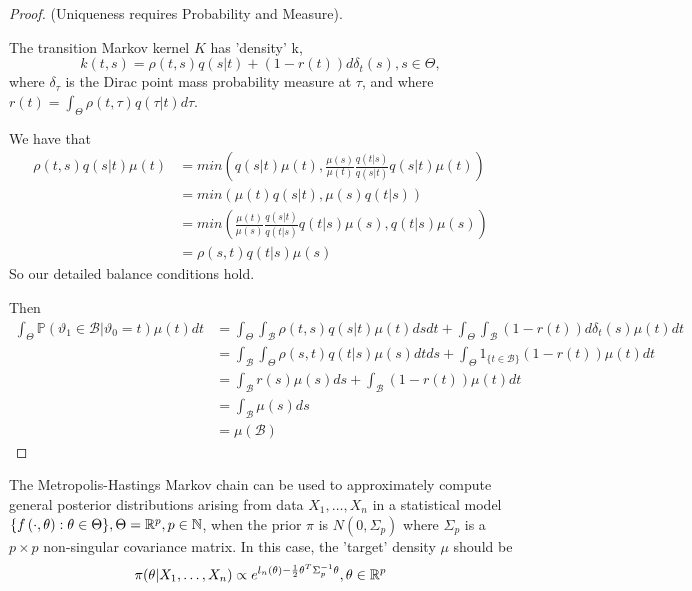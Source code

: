 \documentclass[a4paper]{article}
\begin{document}
 \begin{proof}
	 (Uniqueness requires Probability and Measure).

	 The transition Markov kernel $K$ has 'density' k,
	 \[
		 k(t,s) = \rho(t,s)q(s|t) + (1-r(t))d\delta_{t}(s), s \in \Theta
	 ,\]
	 where $\delta_{\tau}$ is the Dirac point mass probability measure at $\tau$, and where $r(t) = \int_{\Theta} \rho(t, \tau)q(\tau|t) d\tau$.

	 We have that
	 \begin{align*}
		 \rho(t,s)q(s|t)\mu(t) &= min\left( q(s|t)\mu(t), \frac{\mu(s)}{\mu(t)} \frac{q(t|s)}{q(s|t)} q(s|t)\mu(t) \right)  \\
		 &= min\left( \mu(t)q(s|t), \mu(s) q(t|s) \right)  \\
		 &= min\left( \frac{\mu(t)}{\mu(s)} \frac{q(s|t)}{q(t|s)} q(t|s)\mu(s), q(t|s)\mu(s) \right)  \\ 
		 &= \rho(s,t)q(t|s)\mu(s)
	 \end{align*}
	So our detailed balance conditions hold.

	Then
	\begin{align*}
		\int_{\Theta} \mathbb{P}\left( \vartheta_1 \in \mathcal{B} | \vartheta_0 =t \right) \mu(t) dt &= \int_{\Theta}\int_{\mathcal{B}} \rho(t,s)q(s|t)\mu(t) dsdt + \int_{\Theta}\int_{\mathcal{B}} (1-r(t))d\delta_{t}(s)\mu(t)dt \\
		&= \int_{\mathcal{B}}\int_{\Theta} \rho(s,t)q(t|s)\mu(s) dt ds + \int_{\Theta} 1_{\{t\in \mathcal{B}\} } (1-r(t))\mu(t) dt \\
		&= \int_{\mathcal{B}} r(s) \mu(s) ds + \int_{\mathcal{B}} (1-r(t)) \mu(t) dt \\
		&= \int_{\mathcal{B}} \mu(s) ds \\
		&= \mu(\mathcal{B})
	\end{align*}
\end{proof}

The Metropolis-Hastings Markov chain can be used to approximately compute general posterior distributions arising from data $X_1, \ldots, X_n$ in a statistical model $\{f\left( \cdot , \theta \right) : \theta \in \Theta \}, \Theta = \mathbb{R}^{p}, p \in \mathbb{N}$, when the prior $\pi$ is $N(0, \Sigma_p)$ where $\Sigma_p$ is a $p\times p$ non-singular covariance matrix. In this case, the 'target' density $\mu$ should be
\[
	\pi(\theta|X_1,\ldots,X_n) \propto e^{l_n(\theta) - \frac{1}{2} \theta^{T}\Sigma_p^{-1} \theta}, \theta \in \mathbb{R}^{p}
\] 
\end{document}
